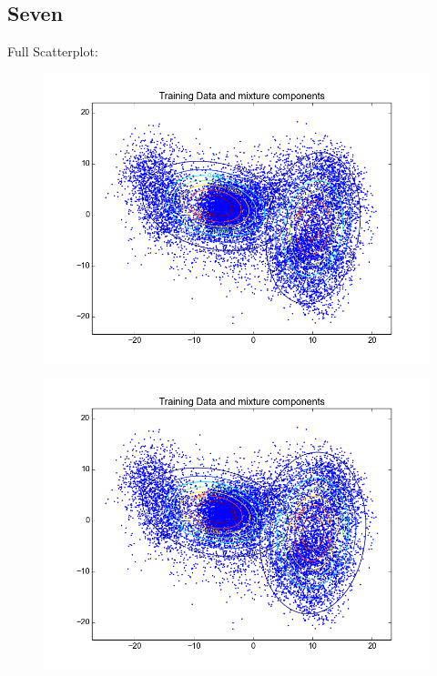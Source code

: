 \documentclass[11pt,a4paper]{article}
\begin{document}
\subsection{Seven}
Full Scatterplot: \\
\begin{minipage}[b]{0.25\textwidth}
\begin{figure}[H]
  \centering
  \includegraphics[width=.8\linewidth]{Figures/contours_digitseven0.png}
  \label{fig:sfig1}
\end{figure}%
\end{minipage}
\begin{minipage}[b]{0.25\textwidth}
\begin{figure}[H]
  \centering
  \includegraphics[width=.8\linewidth]{Figures/contours_digitseven5.png}

  \label{fig:sfig1}
\end{figure}%
\end{minipage}
\end{document}

